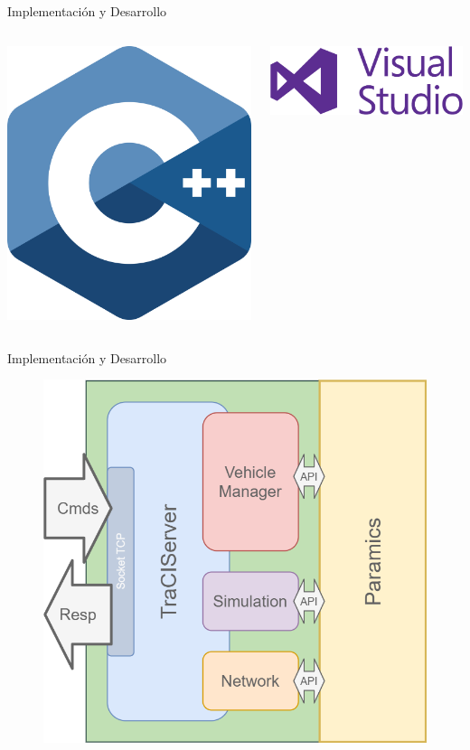 \documentclass[aspectratio=169]{beamer}
\begin{document}
\begin{frame}{Implementación y Desarrollo}
\begin{columns}
    \begin{column}{.5\linewidth}
        \centering
        \includegraphics[width=.5\linewidth]{figuras/c++.png}
    \end{column}
    \begin{column}{.5\linewidth}
        \centering
        \includegraphics[width=.8\linewidth]{figuras/VisualStudio.png}
    \end{column}
\end{columns}
\end{frame}

\begin{frame}{Implementación y Desarrollo}
\begin{figure}
    \centering
    \includegraphics[width=.5\linewidth]{figuras/modules_pveins.png}
\end{figure}
\end{frame}
\end{document}
